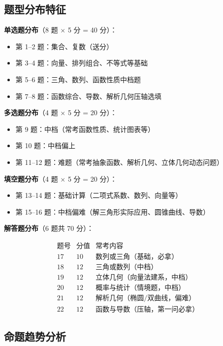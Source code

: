 \subsection{题型分布特征}

\textbf{单选题分布}（8 题 × 5 分 = 40 分）：
\begin{itemize}
  \item 第 1--2 题：集合、复数（送分）
  \item 第 3--4 题：向量、排列组合、不等式等基础
  \item 第 5--6 题：三角、数列、函数性质中档题
  \item 第 7--8 题：函数综合、导数、解析几何压轴选填
\end{itemize}

\textbf{多选题分布}（4 题 × 5 分 = 20 分）：
\begin{itemize}
  \item 第 9 题：中档（常考函数性质、统计图表等）
  \item 第 10 题：中档偏上
  \item 第 11--12 题：难题（常考抽象函数、解析几何、立体几何动态问题）
\end{itemize}

\textbf{填空题分布}（4 题 × 5 分 = 20 分）：
\begin{itemize}
  \item 第 13--14 题：基础计算（二项式系数、数列、向量等）
  \item 第 15--16 题：中档偏难（解三角形实际应用、圆锥曲线、导数）
\end{itemize}

\textbf{解答题分布}（6 题共 70 分）：

\[
\begin{array}{c|c|c}
\text{题号} & \text{分值} & \text{常考内容} \\ \hline
17 & 10 & \text{数列或三角（基础，必拿）} \\
18 & 12 & \text{三角或数列（中档）} \\
19 & 12 & \text{立体几何（向量法建系，中档）} \\
20 & 12 & \text{概率与统计（情境题，中档）} \\
21 & 12 & \text{解析几何（椭圆/双曲线，偏难）} \\
22 & 12 & \text{函数与导数（压轴，第一问必拿）}
\end{array}
\]

\subsection{命题趋势分析}

